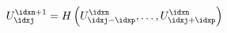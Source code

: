 \begin{defnbox}\nospacing
    \begin{defn}
        \label{defn:general_evolution_equation}
        \begin{align}
          U_{\idxj}^{\idxn+1}=H \left(U_{\idxj-\idxp}^{\idxn},\ldots,U_{\idxj+\idxp}^{\idxn}\right)
        \end{align}
    \end{defn}
\end{defnbox}


